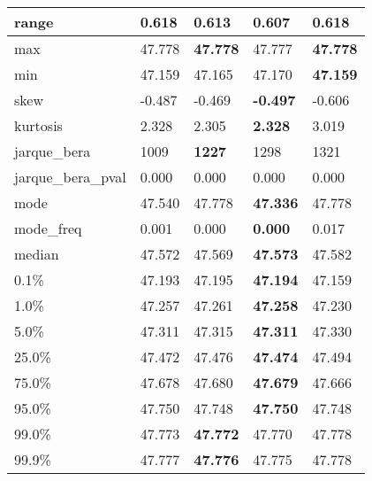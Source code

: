 \begin{table}[H]
\begin{tabular}{|l|m{10em}|m{10em}|m{10em}|m{10em}|}
\hline range & 0.618 & 0.613 & \cellcolor[rgb]{0.9, 0.54, 0.52} 0.607 & \bfseries 0.618 \\
\hline max & 47.778 & \bfseries 47.778 & \cellcolor[rgb]{0.9, 0.54, 0.52} 47.777 & \bfseries 47.778 \\
\hline min & 47.159 & 47.165 & \cellcolor[rgb]{0.9, 0.54, 0.52} 47.170 & \bfseries 47.159 \\
\hline skew & -0.487 & -0.469 & \bfseries -0.497 & \cellcolor[rgb]{0.9, 0.54, 0.52} -0.606 \\
\hline kurtosis & 2.328 & 2.305 & \bfseries 2.328 & \cellcolor[rgb]{0.9, 0.54, 0.52} 3.019 \\
\hline jarque\_bera & 1009 & \bfseries 1227 & 1298 & \cellcolor[rgb]{0.9, 0.54, 0.52} 1321 \\
\hline jarque\_bera\_pval & 0.000 & 0.000 & 0.000 & 0.000 \\
\hline mode & 47.540 & \cellcolor[rgb]{0.9, 0.54, 0.52} 47.778 & \bfseries 47.336 & \cellcolor[rgb]{0.9, 0.54, 0.52} 47.778 \\
\hline mode\_freq & 0.001 & 0.000 & \bfseries 0.000 & \cellcolor[rgb]{0.9, 0.54, 0.52} 0.017 \\
\hline median & 47.572 & 47.569 & \bfseries 47.573 & \cellcolor[rgb]{0.9, 0.54, 0.52} 47.582 \\
\hline 0.1\% & 47.193 & 47.195 & \bfseries 47.194 & \cellcolor[rgb]{0.9, 0.54, 0.52} 47.159 \\
\hline 1.0\% & 47.257 & 47.261 & \bfseries 47.258 & \cellcolor[rgb]{0.9, 0.54, 0.52} 47.230 \\
\hline 5.0\% & 47.311 & 47.315 & \bfseries 47.311 & \cellcolor[rgb]{0.9, 0.54, 0.52} 47.330 \\
\hline 25.0\% & 47.472 & 47.476 & \bfseries 47.474 & \cellcolor[rgb]{0.9, 0.54, 0.52} 47.494 \\
\hline 75.0\% & 47.678 & 47.680 & \bfseries 47.679 & \cellcolor[rgb]{0.9, 0.54, 0.52} 47.666 \\
\hline 95.0\% & 47.750 & \cellcolor[rgb]{0.9, 0.54, 0.52} 47.748 & \bfseries 47.750 & 47.748 \\
\hline 99.0\% & 47.773 & \bfseries 47.772 & 47.770 & \cellcolor[rgb]{0.9, 0.54, 0.52} 47.778 \\
\hline 99.9\% & 47.777 & \bfseries 47.776 & \cellcolor[rgb]{0.9, 0.54, 0.52} 47.775 & 47.778 \\
\hline
\end{tabular}
\end{table}
